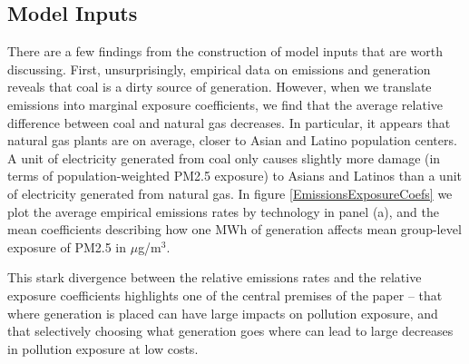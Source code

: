 \documentclass[a4paper]{article}
\theoremstyle{definition}
\theoremstyle{plain}
\begin{document}
\subsection{Model Inputs}
There are a few findings from the construction of model inputs that are worth discussing. First, unsurprisingly, empirical data on emissions and generation reveals that coal is a dirty source of generation. However, when we translate emissions into marginal exposure coefficients, we find that the average relative difference between coal and natural gas decreases. In particular, it appears that natural gas plants are on average, closer to Asian and Latino population centers. A unit of electricity generated from coal only causes slightly more damage (in terms of population-weighted PM2.5 exposure) to Asians and Latinos than a unit of electricity generated from natural gas. In figure \ref{EmissionsExposureCoefs} we plot the average empirical emissions rates by technology in panel (a), and the mean coefficients describing how one MWh of generation affects mean group-level exposure of PM2.5 in $\mu$g/m$^3$. 

This stark divergence between the relative emissions rates and the relative exposure coefficients highlights one of the central premises of the paper -- that where generation is placed can have large impacts on pollution exposure, and that selectively choosing what generation goes where can lead to large decreases in pollution exposure at low costs.
\end{document}
